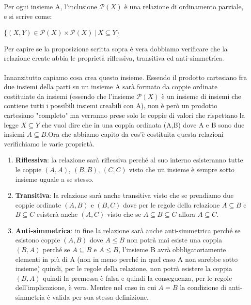 \begin{proposition}
Per ogni insieme A, l'inclusione $\mathcal{P}(X)$ è una relazione di ordinamento parziale, e si scrive come:
\begin{center}
    $\{(X,Y) \in \mathcal{P}(X) \times \mathcal{P}(X) \: | \: X \subseteq Y\}$
\end{center}
\end{proposition}
Per capire se la proposizione scritta sopra è vera dobbiamo verificare che la relazione create abbia le proprietà riflessiva, transitiva ed anti-simmetrica.\\ \\
Innanzitutto capiamo cosa crea questo insieme. Essendo il prodotto cartesiano fra due insiemi della parti su un insieme A sarà formato da coppie ordinate costituiate da insiemi (essendo che l'insieme $\mathcal{P}(X)$ è un insieme di insiemi che contiene tutti i possibili insiemi creabili con A), non è però un prodotto cartesiano "completo" ma verranno prese solo le coppie di valori che rispettano la legge $X \subseteq Y$ che vuol dire che in una coppia ordinata (A,B) dove A e B sono due insiemi $A \subseteq B$.Ora che abbiamo capito da cos'è costituita questa relazioni verifichiamo le varie proprietà.
\begin{enumerate}
    \item \textbf{Riflessiva}: la relazione sarà riflessiva perché al suo interno esisteranno tutte le coppie $(A,A)$, $(B,B)$, $(C,C)$ visto che un insieme è sempre sotto insieme uguale a se stesso.
    \item \textbf{Transitiva}: la relazione sarà anche transitiva visto che se prendiamo due coppie ordinate $(A,B)$ e $(B,C)$ dove per le regole della relazione $A \subseteq B$ e $B \subseteq C$ esisterà anche $(A,C)$ visto che se $A \subseteq B \subseteq C$ allora $A \subseteq C$.
    \item \textbf{Anti-simmetrica}: in fine la relazione sarà anche anti-simmetrica perché se esistono coppie $(A,B)$ dove $A \leq B$ non potrà mai esiste una coppia $(B,A)$ perché se $A \subseteq B$ e $A \leq B$, l'insieme B avrà obbligatoriamente elementi in più di A (non in meno perché in quel caso A non sarebbe sotto insieme) quindi, per le regole della relazione, non potrà esistere la coppia $(B,A)$ quindi la premessa è falsa e quindi la conseguenza, per le regole dell'implicazione, è vera. Mentre nel caso in cui $A = B$ la condizione di anti-simmetria è valida per sua stessa definizione.
\end{enumerate}

